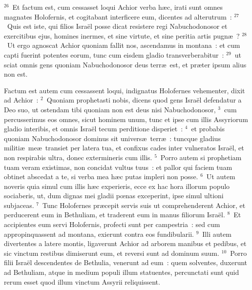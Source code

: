 ${}^{26}$~Et factum est, cum cessasset loqui Achior verba h\ae c, irati sunt omnes magnates Holofernis, et cogitabant interficere eum, dicentes ad alterutrum~:
${}^{27}$~Quis est iste, qui filios Isra\"el posse dicat resistere regi Nabuchodonosor et exercitibus ejus, homines inermes, et sine virtute, et sine peritia artis pugn\ae~?
${}^{28}$~Ut ergo agnoscat Achior quoniam fallit nos, ascendamus in montana~: et cum capti fuerint potentes eorum, tunc cum eisdem gladio transverberabitur~:
${}^{29}$~ut sciat omnis gens quoniam Nabuchodonosor deus terr\ae\ est, et pr\ae ter ipsum alius non est.

\lettrine[lines=3,image=true,loversize=0.05,lraise=-0.03]{F}{}actum est autem cum cessassent loqui, indignatus Holofernes vehementer, dixit ad Achior~:
${}^{2}$~Quoniam prophetasti nobis, dicens quod gens Isra\"el defendatur a Deo suo, ut ostendam tibi quoniam non est deus nisi Nabuchodonosor,
${}^{3}$~cum percusserimus eos omnes, sicut hominem unum, tunc et ipse cum illis Assyriorum gladio interibis, et omnis Isra\"el tecum perditione disperiet~:
${}^{4}$~et probabis quoniam Nabuchodonosor dominus sit univers\ae\ terr\ae~: tuncque gladius militi\ae\ me\ae\ transiet per latera tua, et confixus cades inter vulneratos Isra\"el, et non respirabis ultra, donec extermineris cum illis.
${}^{5}$~Porro autem si prophetiam tuam veram existimas, non concidat vultus tuus~: et pallor qui faciem tuam obtinet abscedat a te, si verba mea h\ae c putas impleri non posse.
${}^{6}$~Ut autem noveris quia simul cum illis h\ae c experieris, ecce ex hac hora illorum populo sociaberis, ut, dum dignas mei gladii pœnas exceperint, ipse simul ultioni subjaceas.
${}^{7}$~Tunc Holofernes pr\ae cepit servis suis ut comprehenderent Achior, et perducerent eum in Bethuliam, et traderent eum in manus filiorum Isra\"el.
${}^{8}$~Et accipientes eum servi Holofernis, profecti sunt per campestria~: sed cum appropinquassent ad montana, exierunt contra eos fundibularii.
${}^{9}$~Illi autem divertentes a latere montis, ligaverunt Achior ad arborem manibus et pedibus, et sic vinctum restibus dimiserunt eum, et reversi sunt ad dominum suum.
${}^{10}$~Porro filii Isra\"el descendentes de Bethulia, venerunt ad eum~: quem solventes, duxerunt ad Bethuliam, atque in medium populi illum statuentes, percunctati sunt quid rerum esset quod illum vinctum Assyrii reliquissent.


